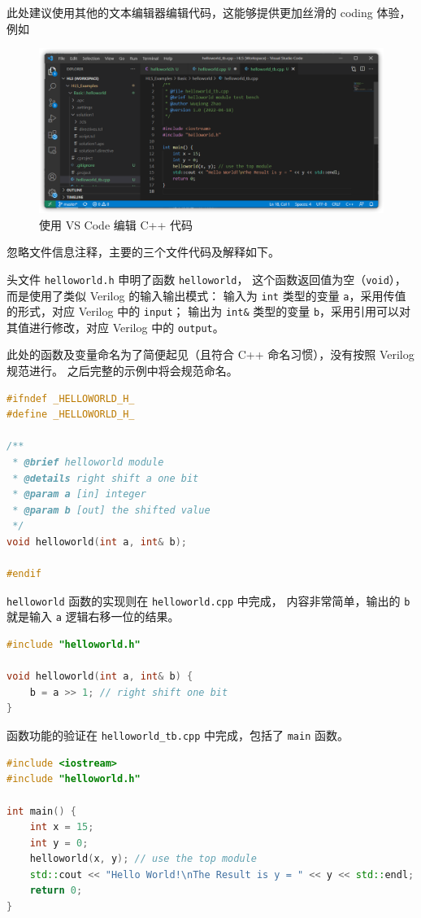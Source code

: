 \documentclass[Chinese,TC,use boldface,simple name]{beaulivre}
\begin{document}
    此处建议使用其他的文本编辑器编辑代码，这能够提供更加丝滑的 coding 体验，例如
    \begin{figure}[htbp]
      \centering
      \includegraphics[width=.8\linewidth]{win/helloworld/vscode_edit.png}
      \caption{使用 VS Code 编辑 C++ 代码}
    \end{figure}

    忽略文件信息注释，主要的三个文件代码及解释如下。

    头文件 \texttt{helloworld.h} 申明了函数 \texttt{helloworld}，
    这个函数返回值为空（\texttt{void}），
    而是使用了类似 Verilog 的输入输出模式：
    输入为 \texttt{int} 类型的变量 \texttt{a}，采用传值的形式，对应 Verilog 中的 \texttt{input}；
    输出为 \texttt{int\&} 类型的变量 \texttt{b}，采用引用可以对其值进行修改，对应 Verilog 中的 \texttt{output}。
    \begin{warning}
      此处的函数及变量命名为了简便起见（且符合 C++ 命名习惯），没有按照 Verilog 规范进行。
      之后完整的示例中将会规范命名。
    \end{warning}
    \begin{lstlisting}[language=C++, title={helloworld.h}]
#ifndef _HELLOWORLD_H_
#define _HELLOWORLD_H_

/**
 * @brief helloworld module
 * @details right shift a one bit
 * @param a [in] integer
 * @param b [out] the shifted value
 */
void helloworld(int a, int& b);

#endif
    \end{lstlisting}
    
    \texttt{helloworld} 函数的实现则在 \texttt{helloworld.cpp} 中完成，
    内容非常简单，输出的 \texttt{b} 就是输入 \texttt{a} 逻辑右移一位的结果。
    \begin{lstlisting}[language=C++, title={helloworld.cpp}]
#include "helloworld.h"

void helloworld(int a, int& b) {
    b = a >> 1; // right shift one bit
}
    \end{lstlisting}

    函数功能的验证在 \texttt{helloworld\_tb.cpp} 中完成，包括了 \texttt{main} 函数。
    \begin{lstlisting}[language=C++, title={helloworld\_tb.cpp},morekeywords={std,cout,endl}]
#include <iostream>
#include "helloworld.h"

int main() {
    int x = 15;
    int y = 0;
    helloworld(x, y); // use the top module
    std::cout << "Hello World!\nThe Result is y = " << y << std::endl;
    return 0;
}
    \end{lstlisting}
\end{document}
